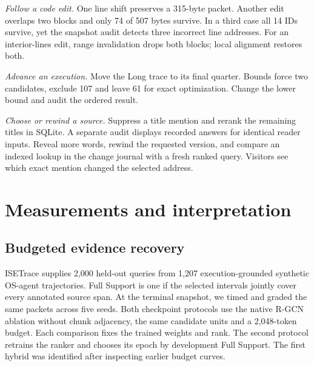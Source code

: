 \documentclass[conference]{IEEEtran}
\begin{document}
\textit{Follow a code edit.} One line shift preserves a 315-byte packet. Another edit overlaps two blocks and only 74 of 507 bytes survive. In a third case all 14 IDs survive, yet the snapshot audit detects three incorrect line addresses. For an interior-lines edit, range invalidation drops both blocks; local alignment restores both.

\textit{Advance an execution.} Move the Long trace to its final quarter. Bounds force two candidates, exclude 107 and leave 61 for exact optimization. Change the lower bound and audit the ordered result.

\textit{Choose or rewind a source.} Suppress a title mention and rerank the remaining titles in SQLite. A separate audit displays recorded answers for identical reader inputs. Reveal more words, rewind the requested version, and compare an indexed lookup in the change journal with a fresh ranked query. Visitors see which exact mention changed the selected address.

\section{Measurements and interpretation}
\subsection{Budgeted evidence recovery}
ISETrace supplies 2,000 held-out queries from 1,207 execution-grounded synthetic OS-agent trajectories. Full Support is one if the selected intervals jointly cover every annotated source span. At the terminal snapshot, we timed and graded the same packets across five seeds. Both checkpoint protocols use the native R-GCN ablation without chunk adjacency, the same candidate units and a 2,048-token budget. Each comparison fixes the trained weights and rank. The second protocol retrains the ranker and chooses its epoch by development Full Support. The first hybrid was identified after inspecting earlier budget curves.
\end{document}
